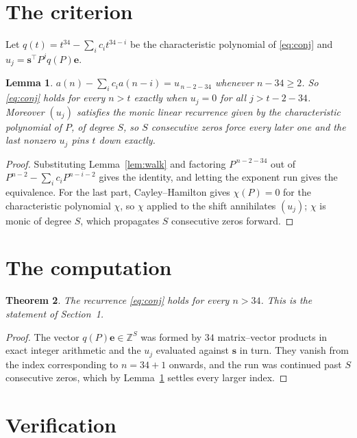 \documentclass[11pt,a4paper]{article}
\theoremstyle{plain}
\newtheorem{theorem}{Theorem}
\newtheorem{lemma}[theorem]{Lemma}
\theoremstyle{definition}
\begin{document}
\section{The criterion}

Let $q(t)=t^{34}-\sum_i c_i t^{34-i}$ be the characteristic polynomial of
\eqref{eq:conj} and $u_j=\mathbf{s}^{\!\top}P^{j}q(P)\mathbf{e}$.

\begin{lemma}\label{lem:crit}
$a(n)-\sum_i c_i a(n-i)=u_{\,n-2-34}$ whenever $n-34\ge2$. So \eqref{eq:conj}
holds for every $n>t$ exactly when $u_j=0$ for all $j>t-2-34$. Moreover $(u_j)$
satisfies the monic linear recurrence given by the characteristic polynomial of $P$, of
degree $S$, so $S$ consecutive zeros force every later one and the last nonzero $u_j$ pins
$t$ down exactly.
\end{lemma}

\begin{proof}
Substituting Lemma~\ref{lem:walk} and factoring $P^{\,n-2-34}$ out of
$P^{n-2}-\sum_i c_i P^{n-i-2}$ gives the identity, and letting the exponent run gives the
equivalence. For the last part, Cayley--Hamilton gives $\chi(P)=0$ for the characteristic
polynomial $\chi$, so $\chi$ applied to the shift annihilates $(u_j)$; $\chi$ is monic of
degree $S$, which propagates $S$ consecutive zeros forward.
\end{proof}

\section{The computation}

\begin{theorem}
The recurrence \eqref{eq:conj} holds for every $n>34$. This is the statement of
Section~1.
\end{theorem}

\begin{proof}
The vector $q(P)\mathbf{e}\in\mathbb{Z}^{S}$ was formed by $34$ matrix--vector
products in exact integer arithmetic and the $u_j$ evaluated against $\mathbf{s}$ in turn.
They vanish from the index corresponding to $n=34+1$ onwards, and the run was continued
past $S$ consecutive zeros, which by Lemma~\ref{lem:crit} settles every larger index.
\end{proof}

\section{Verification}
\end{document}
